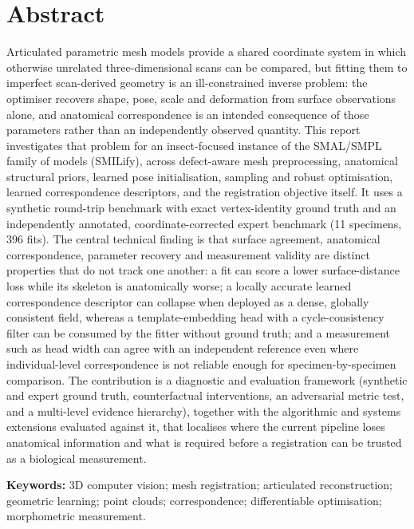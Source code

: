 \thispagestyle{plain}
\section*{Abstract}

Articulated parametric mesh models provide a shared coordinate system in
which otherwise unrelated three-dimensional scans can be compared, but
fitting them to imperfect scan-derived geometry is an ill-constrained inverse
problem: the optimiser recovers shape, pose, scale and deformation from
surface observations alone, and anatomical correspondence is an intended
consequence of those parameters rather than an independently observed
quantity. This report investigates that problem for an insect-focused
instance of the SMAL/SMPL family of models (SMILify), across defect-aware mesh
preprocessing, anatomical structural priors, learned pose initialisation,
sampling and robust optimisation, learned correspondence descriptors, and the
registration objective itself. It uses a synthetic round-trip benchmark with
exact vertex-identity ground truth and an independently annotated,
coordinate-corrected expert benchmark (11 specimens, 396 fits). The central
technical finding is that surface agreement, anatomical correspondence,
parameter recovery and measurement validity are distinct properties that do
not track one another: a fit can score a lower surface-distance loss while its
skeleton is anatomically worse; a locally accurate learned correspondence
descriptor can collapse when deployed as a dense, globally consistent field, whereas a
template-embedding head with a cycle-consistency filter can be consumed by the fitter
without ground truth;
and a measurement such as head width can agree with an independent reference
even where individual-level correspondence is not reliable enough for
specimen-by-specimen comparison. The contribution is a diagnostic and
evaluation framework (synthetic and expert ground truth, counterfactual
interventions, an adversarial metric test, and a multi-level evidence
hierarchy), together with the algorithmic and systems extensions evaluated
against it, that localises where the current pipeline loses anatomical
information and what is required before a registration can be trusted as a
biological measurement.

\medskip
\noindent\textbf{Keywords:} 3D computer vision; mesh registration; articulated
reconstruction; geometric learning; point clouds; correspondence;
differentiable optimisation; morphometric measurement.
